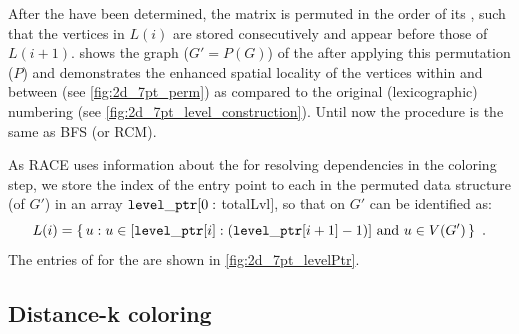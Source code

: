
After the \levels have been determined, the matrix is permuted in the
order of its \levels, such that the vertices in $L(i)$ are stored
consecutively and appear before those of
$L(i+1)$.  shows the graph ($G' = P(G)$)
of the \stex after applying this permutation ($P$) and demonstrates
the enhanced spatial locality of the vertices within and between
\levels (see \cref{fig:2d_7pt_perm}) as compared to the original
(lexicographic) numbering (see \cref{fig:2d_7pt_level_construction}).
Until now the procedure is the same as \acrshort{BFS} (or
\acrshort{RCM}).

As \acrshort{RACE} uses information about the \levels for resolving
dependencies in the coloring step, we store the index of the entry point to each
\level in the permuted data structure (of $G'$) in an array
${\tt level\_ptr}[0:$ \acrshort{totalLvl}$]$, so that \levels on $G'$ can be
identified as:
\begin{equation*}
  L(i) = \set{ u : u \in [{\tt level\_ptr} [i]:({\tt level\_ptr} [i+1]-1)]
    \text{ and } u \in V(G')}~.
\end{equation*}
The entries of \levelPtr for the \stex are shown in \cref{fig:2d_7pt_levelPtr}. 
 
\subsection{Distance-k coloring} \label{subsec:DK}

